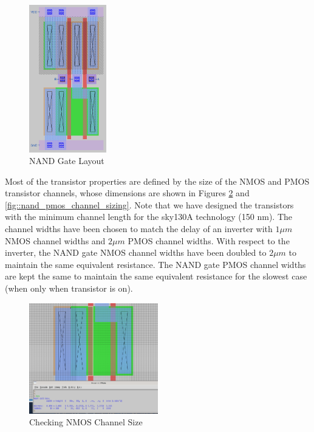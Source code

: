 \documentclass{article}
\begin{document}
	\begin{figure}[H]
		\centerline{\includegraphics[width=0.3\textwidth]{nand_layout.png}}
		\caption{NAND Gate Layout}
		\label{fig::nand_layout}
	\end{figure}

	Most of the transistor properties are defined by the size of the NMOS and PMOS transistor channels, whose dimensions are shown in Figures \ref{fig::nand_nmos_channel_sizing} and \ref{fig::nand_pmos_channel_sizing}. Note that we have designed the transistors with the minimum channel length for the sky130A technology (150 nm). The channel widths have been chosen to match the delay of an inverter with $1 {\mu}m$ NMOS channel widths and $2 {\mu}m$ PMOS channel widths. With respect to the inverter, the NAND gate NMOS channel widths have been doubled to $2 {\mu}m$ to maintain the same equivalent resistance. The NAND gate PMOS channel widths are kept the same to maintain the same equivalent resistance for the slowest case (when only when transistor is on).
	
	\begin{figure}[H]
		\centerline{\includegraphics[width=0.5\textwidth]{nand_nmos_channel_sizing.png}}
		\caption{Checking NMOS Channel Size}
		\label{fig::nand_nmos_channel_sizing}
	\end{figure}
	
\end{document}
